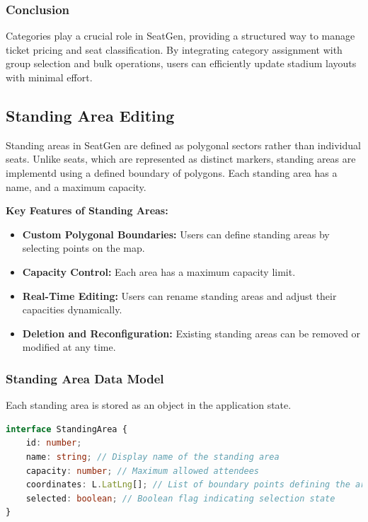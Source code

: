 \subsubsection{Conclusion}
Categories play a crucial role in SeatGen, providing a structured way to manage ticket pricing and seat classification. By integrating category assignment with group selection and bulk operations, users can efficiently update stadium layouts with minimal effort.

\subsection{Standing Area Editing}
Standing areas in SeatGen are defined as polygonal sectors rather than individual seats. Unlike seats, which are represented as distinct markers, standing areas are implementd using a defined boundary of polygons. Each standing area has a name, and a maximum capacity.

\textbf{Key Features of Standing Areas:}
\begin{itemize}
    \item \textbf{Custom Polygonal Boundaries:} Users can define standing areas by selecting points on the map.
    \item \textbf{Capacity Control:} Each area has a maximum capacity limit.
    \item \textbf{Real-Time Editing:} Users can rename standing areas and adjust their capacities dynamically.
    \item \textbf{Deletion and Reconfiguration:} Existing standing areas can be removed or modified at any time.
\end{itemize}

\subsubsection{Standing Area Data Model}
Each standing area is stored as an object in the application state.

\begin{lstlisting}[language=TypeScript, caption=Standing Area Data Model, label=lst:standingarea-model]
interface StandingArea {
    id: number;
    name: string; // Display name of the standing area
    capacity: number; // Maximum allowed attendees
    coordinates: L.LatLng[]; // List of boundary points defining the area
    selected: boolean; // Boolean flag indicating selection state
}
\end{lstlisting}

